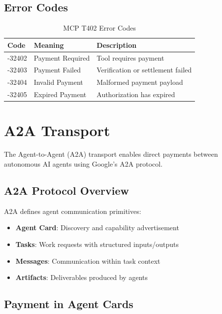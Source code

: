 \subsection{Error Codes}

\begin{table}[htbp]
\centering
\caption{MCP T402 Error Codes}
\label{tab:mcp-errors}
\begin{tabular}{l l p{5cm}}
\toprule
\textbf{Code} & \textbf{Meaning} & \textbf{Description} \\
\midrule
-32402 & Payment Required & Tool requires payment \\
-32403 & Payment Failed & Verification or settlement failed \\
-32404 & Invalid Payment & Malformed payment payload \\
-32405 & Expired Payment & Authorization has expired \\
\bottomrule
\end{tabular}
\end{table}

\section{A2A Transport}
\label{sec:a2a-transport}

The Agent-to-Agent (A2A) transport enables direct payments between autonomous AI agents using Google's A2A protocol.

\subsection{A2A Protocol Overview}

A2A defines agent communication primitives:

\begin{itemize}
    \item \textbf{Agent Card}: Discovery and capability advertisement
    \item \textbf{Tasks}: Work requests with structured inputs/outputs
    \item \textbf{Messages}: Communication within task context
    \item \textbf{Artifacts}: Deliverables produced by agents
\end{itemize}

\subsection{Payment in Agent Cards}

